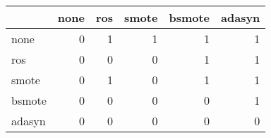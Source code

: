 \begin{tabular}{lrrrrr}
\hline
        &   none &   ros &   smote &   bsmote &   adasyn \\
\hline
 none   &      0 &     1 &       1 &        1 &        1 \\
 ros    &      0 &     0 &       0 &        1 &        1 \\
 smote  &      0 &     1 &       0 &        1 &        1 \\
 bsmote &      0 &     0 &       0 &        0 &        1 \\
 adasyn &      0 &     0 &       0 &        0 &        0 \\
\hline
\end{tabular}